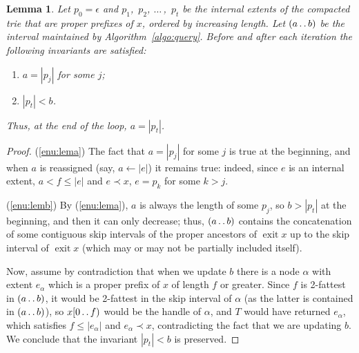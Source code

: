 \documentclass[a4paper,11pt]{article}
\newtheorem{lemma}[theorem]{Lemma}
\newcommand{\?}{\mskip1.5mu}
\def\..{\,\mathpunct{\ldotp\ldotp}} %
\DeclareMathOperator{\exit}{exit}
\begin{document}
\begin{lemma}\label{lem:correctness}
Let $p_0=\epsilon$ and $p_1$,~$p_2$,
$\dots\,$,~$p_t$ be the internal extents of the compacted
trie that are \emph{proper} prefixes of $x$, ordered by increasing length. 
Let $(a\..b)$ be the interval maintained by 
Algorithm~\ref{algo:query}. Before and after each iteration the following invariants 
are satisfied: 
\begin{enumerate}
    \item\label{enu:lema} $a=|p_j|$ for some $j$;
    \item\label{enu:lemb} $|p_t|< b$.
\end{enumerate}
Thus, at the end of the loop, $a=|p_t|$.
\end{lemma}
\begin{proof}
\noindent(\ref{enu:lema})
The fact that $a=|p_j|$ for some $j$ is true at the beginning, and when
$a$ is reassigned (say, $a \leftarrow |e|$) it remains true: indeed, since $e$
is an internal extent, $a<f\leq |e|$ and $e\prec x$, $e=p_k$ for some $k>j$.

\noindent(\ref{enu:lemb})
By (\ref{enu:lema}), $a$ is always the length of some $p_j$,
so $b>|p_t|$ at the beginning, and then it can only decrease; thus,
$(a\..b)$ contains the concatenation of some contiguous skip intervals of the
proper ancestors of $\exit x$ up to the skip interval of $\exit x$ (which may
or may not be partially included itself).

Now, assume by contradiction that when we update $b$ there is a node $\alpha$
with extent $e_\alpha$ which is a proper
prefix of $x$ of length $f$ or greater. Since $f$ is 2-fattest in $(a\..b)$, it
would be 2-fattest in the skip interval of $\alpha$ (as the latter is contained
in $(a\..b)$), so $x[0\..f)$ would be the handle of $\alpha$, and $T$ would have
returned $e_\alpha$, which satisfies $f\leq |e_\alpha|$ and $e_\alpha\prec x$, contradicting the fact that we are
updating $b$. We conclude that the invariant $|p_t|<b$ is preserved.
\end{proof}
\end{document}
